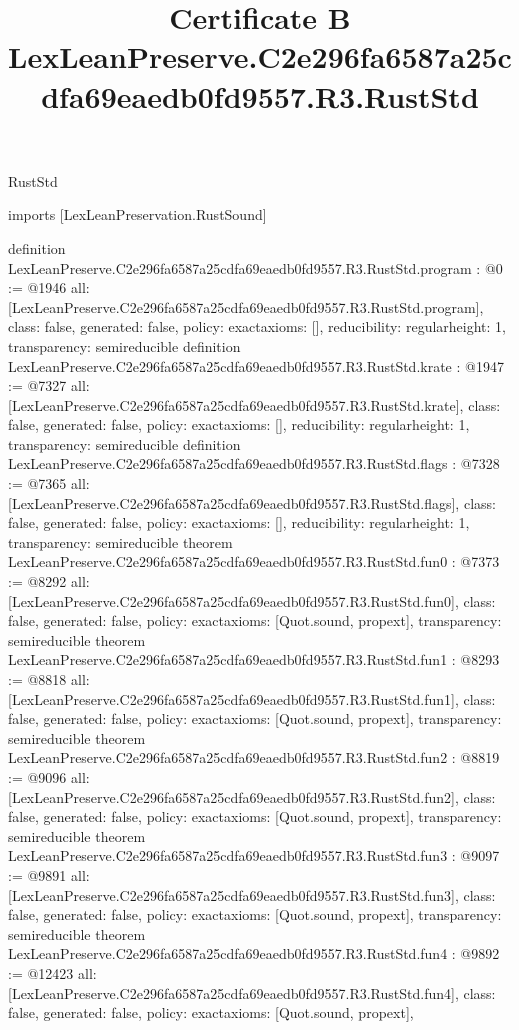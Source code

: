 \begin{lexlean}{RustStd}
\title{Certificate B LexLeanPreserve.C2e296fa6587a25cdfa69eaedb0fd9557.R3.RustStd}
\begin{coremodule}
imports [LexLeanPreservation.RustSound]

definition LexLeanPreserve.C2e296fa6587a25cdfa69eaedb0fd9557.R3.RustStd.program : @0 := @1946 {
  all: [LexLeanPreserve.C2e296fa6587a25cdfa69eaedb0fd9557.R3.RustStd.program],
  class: false,
  generated: false,
  policy: exact{axioms: []},
  reducibility: regular{height: 1},
  transparency: semireducible
}
definition LexLeanPreserve.C2e296fa6587a25cdfa69eaedb0fd9557.R3.RustStd.krate : @1947 := @7327 {
  all: [LexLeanPreserve.C2e296fa6587a25cdfa69eaedb0fd9557.R3.RustStd.krate],
  class: false,
  generated: false,
  policy: exact{axioms: []},
  reducibility: regular{height: 1},
  transparency: semireducible
}
definition LexLeanPreserve.C2e296fa6587a25cdfa69eaedb0fd9557.R3.RustStd.flags : @7328 := @7365 {
  all: [LexLeanPreserve.C2e296fa6587a25cdfa69eaedb0fd9557.R3.RustStd.flags],
  class: false,
  generated: false,
  policy: exact{axioms: []},
  reducibility: regular{height: 1},
  transparency: semireducible
}
theorem LexLeanPreserve.C2e296fa6587a25cdfa69eaedb0fd9557.R3.RustStd.fun0 : @7373 := @8292 {
  all: [LexLeanPreserve.C2e296fa6587a25cdfa69eaedb0fd9557.R3.RustStd.fun0],
  class: false,
  generated: false,
  policy: exact{axioms: [Quot.sound, propext]},
  transparency: semireducible
}
theorem LexLeanPreserve.C2e296fa6587a25cdfa69eaedb0fd9557.R3.RustStd.fun1 : @8293 := @8818 {
  all: [LexLeanPreserve.C2e296fa6587a25cdfa69eaedb0fd9557.R3.RustStd.fun1],
  class: false,
  generated: false,
  policy: exact{axioms: [Quot.sound, propext]},
  transparency: semireducible
}
theorem LexLeanPreserve.C2e296fa6587a25cdfa69eaedb0fd9557.R3.RustStd.fun2 : @8819 := @9096 {
  all: [LexLeanPreserve.C2e296fa6587a25cdfa69eaedb0fd9557.R3.RustStd.fun2],
  class: false,
  generated: false,
  policy: exact{axioms: [Quot.sound, propext]},
  transparency: semireducible
}
theorem LexLeanPreserve.C2e296fa6587a25cdfa69eaedb0fd9557.R3.RustStd.fun3 : @9097 := @9891 {
  all: [LexLeanPreserve.C2e296fa6587a25cdfa69eaedb0fd9557.R3.RustStd.fun3],
  class: false,
  generated: false,
  policy: exact{axioms: [Quot.sound, propext]},
  transparency: semireducible
}
theorem LexLeanPreserve.C2e296fa6587a25cdfa69eaedb0fd9557.R3.RustStd.fun4 : @9892 := @12423 {
  all: [LexLeanPreserve.C2e296fa6587a25cdfa69eaedb0fd9557.R3.RustStd.fun4],
  class: false,
  generated: false,
  policy: exact{axioms: [Quot.sound, propext]},
}
\end{coremodule}
\end{lexlean}
